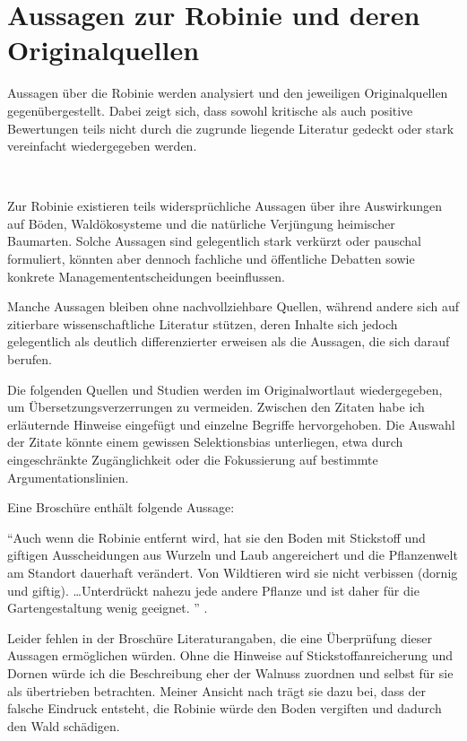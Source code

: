 \documentclass[twocolumn]{scrartcl}
\makeatletter
\newcommand{\summary}[1]{%
  \par %
  {\small\sffamily
    \noindent #1\par}
  \vspace{-0.4em}
  \noindent\makebox[\linewidth]{\rule{0.33\linewidth}{0.4pt}}\\[-1.2em]
  \@afterindentfalse\@afterheading
}
\makeatother
\begin{document}
\section{Aussagen zur Robinie und deren Originalquellen}

\summary{Aussagen über die Robinie werden analysiert und den
  jeweiligen Originalquellen gegenübergestellt. Dabei zeigt sich, dass
  sowohl kritische als auch positive Bewertungen teils nicht durch die
  zugrunde liegende Literatur gedeckt oder stark vereinfacht
  wiedergegeben werden.}

Zur Robinie existieren teils widersprüchliche Aussagen über ihre
Auswirkungen auf Böden, Waldökosysteme und die natürliche Verjüngung
heimischer Baumarten. Solche Aussagen sind gelegentlich stark verkürzt
oder pauschal formuliert, könnten aber dennoch fachliche und
öffentliche Debatten sowie konkrete Managemententscheidungen
beeinflussen.

Manche Aussagen bleiben ohne nachvollziehbare Quellen, während andere
sich auf zitierbare wissenschaftliche Literatur stützen, deren Inhalte
sich jedoch gelegentlich als deutlich differenzierter erweisen als die
Aussagen, die sich darauf berufen.

Die folgenden Quellen und Studien werden im Originalwortlaut
wiedergegeben, um Übersetzungsverzerrungen zu vermeiden. Zwischen den
Zitaten habe ich erläuternde Hinweise eingefügt und einzelne Begriffe
hervorgehoben. Die Auswahl der Zitate könnte einem gewissen
Selektionsbias unterliegen, etwa durch eingeschränkte Zugänglichkeit
oder die Fokussierung auf bestimmte Argumentationslinien.

Eine Broschüre enthält folgende Aussage:

\enquote{Auch wenn die Robinie entfernt wird,
hat sie den Boden mit Stickstoff und giftigen Ausscheidungen aus Wurzeln und
Laub angereichert und die Pflanzenwelt am Standort dauerhaft verändert. Von
Wildtieren wird sie nicht verbissen (dornig und giftig). \dots Unterdrückt
nahezu jede andere Pflanze und ist daher für die Gartengestaltung wenig
geeignet.%
} \citep{oebf2019aliensAusDemGarten}.

Leider fehlen in der Broschüre Literaturangaben, die eine Überprüfung
dieser Aussagen ermöglichen würden. Ohne die Hinweise auf
Stickstoffanreicherung und Dornen würde ich die Beschreibung eher der
Walnuss zuordnen und selbst für sie als übertrieben betrachten. Meiner
Ansicht nach trägt sie dazu bei, dass der falsche Eindruck entsteht,
die Robinie würde den Boden vergiften und dadurch den Wald schädigen.
\end{document}

